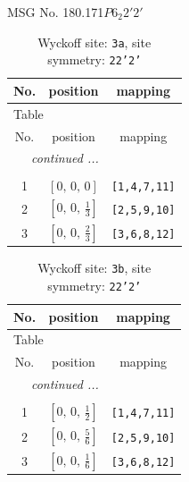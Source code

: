 \documentclass[fleqn,8pt]{jsarticle}
\begin{document}
\setcounter{MaxMatrixCols}{32}

\renewcommand{\tablename}{Table~}
\renewcommand{\figurename}{Figure~}
\begin{center}
\LARGE
MSG No. 180.171\quad$P6_{2}2'2'$
\end{center}
\renewcommand{\arraystretch}{1.2}
\begin{longtable}{ccc}
\caption{Wyckoff site: {\tt 3a}, site symmetry: {\tt 22'2'}}
 \\
 \hline \hline
No. & position & mapping \\ \hline \endfirsthead

\multicolumn{2}{l}{\tablename\ \thetable{}} \\
 \hline \hline
No. & position & mapping \\ \hline \endhead

 \hline \hline
\multicolumn{2}{r}{\footnotesize\it continued ...} \\ \endfoot

 \hline \hline
\multicolumn{2}{r}{} \\ \endlastfoot

1 & $\left[ 0,\, 0,\, 0 \right]$ & {\tt [1,4,7,11]} \\ \hline
2 & $\left[ 0,\, 0,\, \frac{1}{3} \right]$ & {\tt [2,5,9,10]} \\ \hline
3 & $\left[ 0,\, 0,\, \frac{2}{3} \right]$ & {\tt [3,6,8,12]} \\
\end{longtable}
\renewcommand{\arraystretch}{1.2}
\begin{longtable}{ccc}
\caption{Wyckoff site: {\tt 3b}, site symmetry: {\tt 22'2'}}
 \\
 \hline \hline
No. & position & mapping \\ \hline \endfirsthead

\multicolumn{2}{l}{\tablename\ \thetable{}} \\
 \hline \hline
No. & position & mapping \\ \hline \endhead

 \hline \hline
\multicolumn{2}{r}{\footnotesize\it continued ...} \\ \endfoot

 \hline \hline
\multicolumn{2}{r}{} \\ \endlastfoot

1 & $\left[ 0,\, 0,\, \frac{1}{2} \right]$ & {\tt [1,4,7,11]} \\ \hline
2 & $\left[ 0,\, 0,\, \frac{5}{6} \right]$ & {\tt [2,5,9,10]} \\ \hline
3 & $\left[ 0,\, 0,\, \frac{1}{6} \right]$ & {\tt [3,6,8,12]} \\
\end{longtable}
\end{document}
